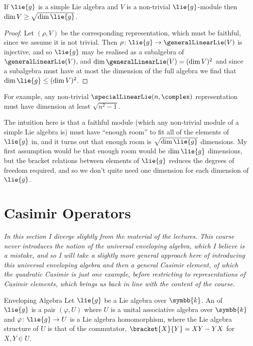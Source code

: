 \documentclass[fleqn]{NotesClass}
\renewcommand{\field}{\symbb{k}}
\begin{document}
    \begin{crl}{}{}
        If \(\lie{g}\) is a simple Lie algebra and \(V\) is a non-trivial \(\lie{g}\)-module then \(\dim V \ge \sqrt{\dim \lie{g}}\).
        \begin{proof}
            Let \((\rho, V)\) be the corresponding representation, which must be faithful, since we assume it is not trivial.
            Then \(\rho \colon \lie{g} \to \generalLinearLie(V)\) is injective, and so \(\lie{g}\) may be realised as a subalgebra of \(\generalLinearLie(V)\), and \(\dim \generalLinearLie(V) = (\dim V)^2\) and since a subalgebra must have at most the dimension of the full algebra we find that \(\dim \lie{g} \le (\dim V)^2\).
        \end{proof}
    \end{crl}
    
    For example, any non-trivial \(\specialLinearLie(n, \complex)\) representation must have dimension at least \(\sqrt{n^2 - 1}\).
    
    The intuition here is that a faithful module (which any non-trivial module of a simple Lie algebra is) must have \enquote{enough room} to fit all of the elements of \(\lie{g}\) in, and it turns out that enough room is \(\sqrt{\dim \lie{g}}\) dimensions.
    My first assumption would be that enough room would be \(\dim \lie{g}\) dimensions, but the bracket relations between elements of \(\lie{g}\) reduces the degrees of freedom required, and so we don't quite need one dimension for each dimension of \(\lie{g}\).
    
    \section{Casimir Operators}
    \textit{In this section I diverge slightly from the material of the lectures.
    This course never introduces the notion of the universal enveloping algebra, which I believe is a mistake, and so I will take a slightly more general approach here of introducing this universal enveloping algebra and then a general Casimir element, of which the quadratic Casimir is just one example, before restricting to representations of Casimir elements, which brings us back in line with the content of the course.}
    
    \begin{dfn}{Enveloping Algebra}{}
        Let \(\lie{g}\) be a Lie algebra over \(\field\).
        An  of \(\lie{g}\) is a pair \((\varphi, U)\) where \(U\) is a unital associative algebra over \(\field\) and \(\varphi \colon \lie{g} \to U\) is a Lie algebra homomorphism, where the Lie algebra structure of \(U\) is that of the commutator, \(\bracket{X}{Y} = XY - YX\) for \(X, Y \in U\).
    \end{dfn}
    
\end{document}
